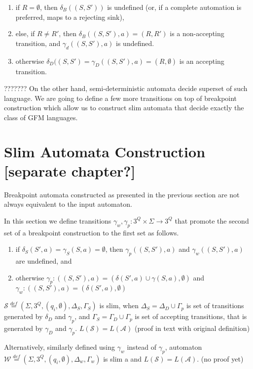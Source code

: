 \documentclass[
	digital
nolof, nolot
]{fithesis3}
\newcommand{\cA}{\mathcal{A}}
\newcommand{\cS}{\mathcal{S}}
\newcommand{\lA}{L(\cA)}
\newcommand{\lS}{L(\cS)}
\newcommand{\eqdef}{\overset{def}{=}}
\begin{document}
			\begin{enumerate}
				\item if $R=\emptyset$, then $\delta_B((S,S'))$ is undefined (or, if a complete automation is preferred, maps to a rejecting sink),
				\item else, if $R \neq R'$, then $\delta_B((S,S'),a)=(R, R')$ is a non-accepting transition,
				and $\gamma_d((S,S'),a)$ is undefined.
				\item otherwise $\delta_D((S,S')=\gamma_D((S,S'),a)=(R, \emptyset)$ is an accepting transition.
			\end{enumerate}
			
			??????? On the other hand, semi-deterministic automata decide superset of such language. We are going to define a few more transitions on top of breakpoint construction which allow us to construct slim automata that decide exactly the class of GFM languages.
			
			\section{Slim Automata Construction [separate chapter?]}
			Breakpoint automata constructed as presented in the previous section are not always equivalent to the input automaton.
			
			In this section we define transitions  $\gamma_w, \gamma_p:3^Q \times \Sigma \rightarrow 3^Q$ that promote the second set of a breakpoint construction to the first set as follows. 
			
			\begin{enumerate}
				\item if $\delta_S(S',a) = \gamma_S(S, a) = \emptyset$, then $\gamma_{p}((S,S'), a)$ and $\gamma_{w}((S,S'), a)$ are undefined, and
				\item otherwise
				$\gamma_{p}:((S,S'),a)=(\delta(S',a)\cup\gamma(S, a),\emptyset)$ and $\gamma_{w}:((S,S'),a)=(\delta(S',a),\emptyset)$
			\end{enumerate}
			
			
			$\cS\eqdef(\Sigma, 3^Q, (q_i,\emptyset), \Delta_S ,\Gamma_S)$ is slim, when
			$\Delta_S=\Delta_D \cup \Gamma_p$ is set of transitions generated by $\delta_D$ and $\gamma_p$, and
			$\Gamma_S=\Gamma_D \cup \Gamma_p$ is set of accepting transitions, that is generated by $\gamma_D$ and $\gamma_p$. $\lS = \lA$ (proof in text with original definition)
			
			Alternatively, similarly defined using $\gamma_w$ instead of $\gamma_{p}$, automaton $\mathcal{W}\eqdef(\Sigma, 3^Q, (q_i,\emptyset), \Delta_w, \Gamma_w)$ is slim a and $\lS=\lA$. (no proof yet)
\end{document}
